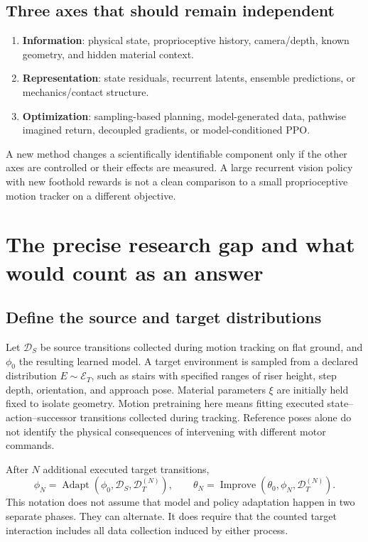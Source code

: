 \subsection{Three axes that should remain independent}
\begin{enumerate}
\item \textbf{Information}: physical state, proprioceptive history, camera/depth,
known geometry, and hidden material context.
\item \textbf{Representation}: state residuals, recurrent latents, ensemble
predictions, or mechanics/contact structure.
\item \textbf{Optimization}: sampling-based planning, model-generated data,
pathwise imagined return, decoupled gradients, or model-conditioned PPO.
\end{enumerate}
A new method changes a scientifically identifiable component only if the other
axes are controlled or their effects are measured. A large recurrent vision
policy with new foothold rewards is not a clean comparison to a small
proprioceptive motion tracker on a different objective.

\section{The precise research gap and what would count as an answer}\label{sec:gap}
\subsection{Define the source and target distributions}
Let $\mathcal D_S$ be source transitions collected during motion tracking on
flat ground, and $\phi_0$ the resulting learned model. A target environment is
sampled from a declared distribution $E\sim\mathcal E_T$, such as stairs with
specified ranges of riser height, step depth, orientation, and approach pose.
Material parameters $\xi$ are initially held fixed to isolate geometry.
Motion pretraining here means fitting executed state--action--successor
transitions collected during tracking. Reference poses alone do not identify
the physical consequences of intervening with different motor commands.

After $N$ additional executed target transitions,
\begin{equation}
\phi_N=\operatorname{Adapt}(\phi_0,\mathcal D_S,\mathcal D_T^{(N)}),\qquad
\theta_N=\operatorname{Improve}(\theta_0,\phi_N,\mathcal D_T^{(N)}).
\end{equation}
This notation does not assume that model and policy adaptation happen in two
separate phases. They can alternate. It does require that the counted target
interaction includes all data collection induced by either process.

